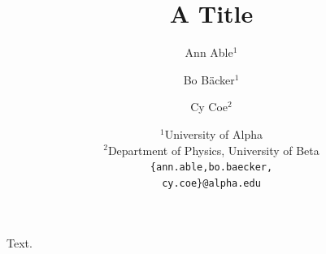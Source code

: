 \documentclass{article}
\title{A Title}
\author{%
  Ann Able$^{1}$ \\
  \and
  Bo Bäcker$^{1}$ \\
  \and
  Cy Coe$^{2}$ \\
  \and
 {\normalfont $^1$University of Alpha} \\
 {\normalfont $^2$Department of Physics, University of Beta} \\
 \texttt{\{ann.able,bo.baecker,}\\
 \texttt{cy.coe\}@alpha.edu}
}
\begin{document}
\maketitle
Text.
\end{document}

